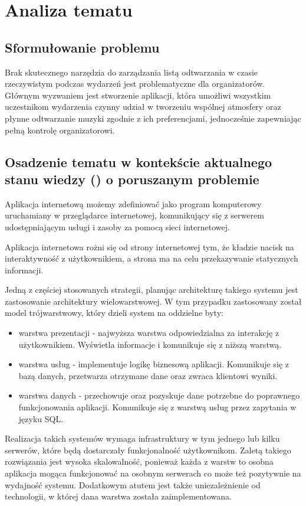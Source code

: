 \chapter{Analiza tematu}

\section{Sformułowanie problemu}
Brak skutecznego narzędzia do zarządzania listą odtwarzania w czasie rzeczywistym podczas wydarzeń jest problematyczne dla organizatorów. Głównym wyzwaniem jest stworzenie aplikacji, która umożliwi wszystkim uczestnikom wydarzenia czynny udział w tworzeniu wspólnej atmosfery oraz płynne odtwarzanie muzyki zgodnie z ich preferencjami, jednocześnie zapewniając pełną kontrolę organizatorowi.

\section{Osadzenie tematu w kontekście aktualnego stanu wiedzy () o poruszanym problemie}

\begin{Definition}\label{def:1}
Aplikacja internetową możemy zdefiniować jako program komputerowy uruchamiany w przeglądarce internetowej, komunikujący się z serwerem udostępniającym usługi i zasoby za pomocą sieci internetowej.
\end{Definition}

Aplikacja internetowa rożni się od strony internetowej tym, że kładzie nacisk na interaktywność z użytkownikiem, a strona ma na celu przekazywanie statycznych informacji.

Jedną z częściej stosowanych strategii, planując architekturę takiego systemu jest zastosowanie architektury wielowarstwowej. W tym przypadku zastosowany został model trójwarstwowy, który dzieli system na oddzielne byty:
\begin{itemize}
\item warstwa prezentacji - najwyższa warstwa odpowiedzialna za interakcję z użytkownikiem. Wyświetla informacje i komunikuje się z niższą warstwą.
\item warstwa usług - implementuje logikę biznesową aplikacji. Komunikuje się z bazą danych, przetwarza otrzymane dane oraz zwraca klientowi wyniki.
\item warstwa danych - przechowuje oraz pozyskuje dane potrzebne do poprawnego funkcjonowania aplikacji. Komunikuje się z warstwą usług przez zapytania w języku SQL.
\end{itemize}
Realizacja takich systemów wymaga infrastruktury w tym jednego lub kilku serwerów, które będą dostarczały funkcjonalność użytkownikom. Zaletą takiego rozwiązania jest wysoka skalowalność, ponieważ każda z warstw to osobna aplikacja mogąca funkcjonować na osobnym serwerach co może też pozytywnie na wydajność systemu. Dodatkowym atutem jest także uniezależnienie od technologii, w której dana warstwa została zaimplementowana.

